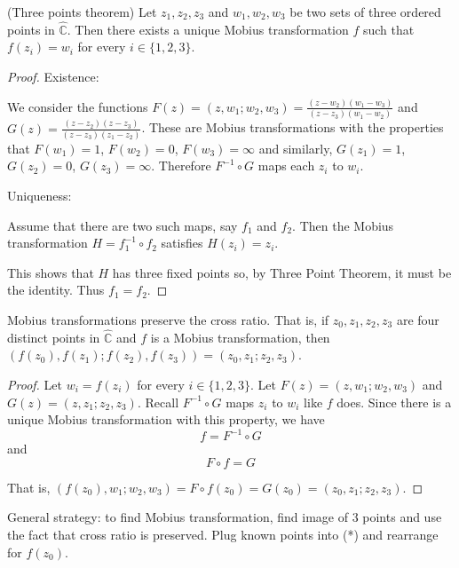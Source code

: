 \begin{theorem}
	(Three points theorem)
	Let ${z_1, z_2, z_3}$ and ${w_1, w_2, w_3}$ be two sets of three ordered points in $\hat{\mathbb{C}}$. Then there exists a unique Mobius transformation $f$ such that $f(z_i) = w_i$ for every $i \in \{1, 2, 3\}$.
\end{theorem}

\begin{proof}
	Existence:

	We consider the functions $F(z) = (z, w_1; w_2, w_3) = \frac{(z - w_2)(w_1 - w_3)}{(z - z_3)(w_1 - w_2)}$ and $G(z) = \frac{(z - z_2)(z - z_3)}{(z - z_3)(z_1 - z_2)}$. These are Mobius transformations with the properties that $F(w_1) = 1$, $F(w_2) = 0$, $F(w_3) = \infty$ and similarly, $G(z_1) = 1$, $G(z_2) = 0$, $G(z_3) = \infty$. Therefore $F^{-1} \circ G$ maps each $z_i$ to $w_i$.

	Uniqueness:

	Assume that there are two such maps, say $f_1$ and $f_2$. Then the Mobius transformation $H = f_1 ^ {-1} \circ f_2$ satisfies $H(z_i) = z_i$.

	This shows that $H$ has three fixed points so, by Three Point Theorem, it must be the identity. Thus $f_1 = f_2$.
\end{proof}

\begin{proposition}
	Mobius transformations preserve the cross ratio. That is, if $z_0, z_1, z_2, z_3$ are four distinct points in $\hat{\mathbb{C}}$ and $f$ is a Mobius transformation, then $(f(z_0), f(z_1); f(z_2), f(z_3)) = (z_0, z_1; z_2, z_3)$.
\end{proposition}

\begin{proof}
	Let $w_i = f(z_i)$ for every $i \in \{1, 2, 3\}$. Let $F(z) = (z, w_1; w_2, w_3)$ and $G(z) = (z, z_1; z_2, z_3)$. Recall $F^{-1} \circ G$ maps $z_i$ to $w_i$ like $f$ does. Since there is a unique Mobius transformation with this property, we have \[f = F^{-1} \circ G\] and \[F \circ f = G\]

	That is, $(f(z_0), w_1; w_2, w_3) = F \circ f (z_0) = G(z_0) = (z_0, z_1; z_2, z_3)$.
\end{proof}

\begin{remark}
	General strategy: to find Mobius transformation, find image of 3 points and use the fact that cross ratio is preserved. Plug known points into (*) and rearrange for $f(z_0)$.
\end{remark}

